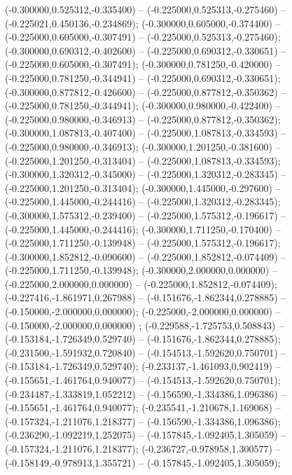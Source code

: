  (-0.300000,0.525312,-0.335400) -- (-0.225000,0.525313,-0.275460) -- (-0.225021,0.450136,-0.234869);
 (-0.300000,0.605000,-0.374400) -- (-0.225000,0.605000,-0.307491) -- (-0.225000,0.525313,-0.275460);
 (-0.300000,0.690312,-0.402600) -- (-0.225000,0.690312,-0.330651) -- (-0.225000,0.605000,-0.307491);
 (-0.300000,0.781250,-0.420000) -- (-0.225000,0.781250,-0.344941) -- (-0.225000,0.690312,-0.330651);
 (-0.300000,0.877812,-0.426600) -- (-0.225000,0.877812,-0.350362) -- (-0.225000,0.781250,-0.344941);
 (-0.300000,0.980000,-0.422400) -- (-0.225000,0.980000,-0.346913) -- (-0.225000,0.877812,-0.350362);
 (-0.300000,1.087813,-0.407400) -- (-0.225000,1.087813,-0.334593) -- (-0.225000,0.980000,-0.346913);
 (-0.300000,1.201250,-0.381600) -- (-0.225000,1.201250,-0.313404) -- (-0.225000,1.087813,-0.334593);
 (-0.300000,1.320312,-0.345000) -- (-0.225000,1.320312,-0.283345) -- (-0.225000,1.201250,-0.313404);
 (-0.300000,1.445000,-0.297600) -- (-0.225000,1.445000,-0.244416) -- (-0.225000,1.320312,-0.283345);
 (-0.300000,1.575312,-0.239400) -- (-0.225000,1.575312,-0.196617) -- (-0.225000,1.445000,-0.244416);
 (-0.300000,1.711250,-0.170400) -- (-0.225000,1.711250,-0.139948) -- (-0.225000,1.575312,-0.196617);
 (-0.300000,1.852812,-0.090600) -- (-0.225000,1.852812,-0.074409) -- (-0.225000,1.711250,-0.139948);
 (-0.300000,2.000000,0.000000) -- (-0.225000,2.000000,0.000000) -- (-0.225000,1.852812,-0.074409);
 (-0.227416,-1.861971,0.267988) -- (-0.151676,-1.862344,0.278885) -- (-0.150000,-2.000000,0.000000);
 (-0.225000,-2.000000,0.000000) -- (-0.150000,-2.000000,0.000000) ;
 (-0.229588,-1.725753,0.508843) -- (-0.153184,-1.726349,0.529740) -- (-0.151676,-1.862344,0.278885);
 (-0.231500,-1.591932,0.720840) -- (-0.154513,-1.592620,0.750701) -- (-0.153184,-1.726349,0.529740);
 (-0.233137,-1.461093,0.902419) -- (-0.155651,-1.461764,0.940077) -- (-0.154513,-1.592620,0.750701);
 (-0.234487,-1.333819,1.052212) -- (-0.156590,-1.334386,1.096386) -- (-0.155651,-1.461764,0.940077);
 (-0.235541,-1.210678,1.169068) -- (-0.157324,-1.211076,1.218377) -- (-0.156590,-1.334386,1.096386);
 (-0.236290,-1.092219,1.252075) -- (-0.157845,-1.092405,1.305059) -- (-0.157324,-1.211076,1.218377);
 (-0.236727,-0.978958,1.300577) -- (-0.158149,-0.978913,1.355721) -- (-0.157845,-1.092405,1.305059);
